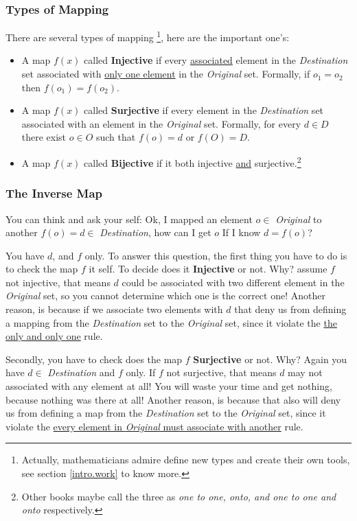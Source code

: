 \subsubsection{Types of Mapping}
There are several types of mapping \footnote{Actually, mathematicians admire define new types and create their own tools, see section \ref{intro.work} to know more.}, here are the important one's:
\begin{itemize}
    \item A map $f(x)$ called {\bf Injective} if every \underline{associated} element in the {\it Destination} set associated with \underline{only one element} in the {\it Original} set. Formally, if $o_1 = o_2$ then $f(o_1) = f(o_2)$.
    \item A map $f(x)$ called {\bf Surjective} if every element in the {\it Destination} set associated with an element in the {\it Original} set. Formally, for every $d \in D$ there exist $o \in O$ such that $f(o)=d$ or $f(O)=D$.
    \item A map $f(x)$ called {\bf Bijective} if it both injective \underline{and} surjective.\footnote{Other books maybe call the three as {\it  one to one, onto, and one to one and onto} respectively.}
\end{itemize}
\subsubsection{The Inverse Map} You can think and ask your self: Ok, I mapped an element $o \in$ {\it Original} to another $f(o) = d \in$ {\it Destination}, how can I get $o$ If I know $d = f(o)$? 

You have $d$, and $f$ only. To answer this question, the first thing you have to do is to check the map $f$ it self. To decide does it {\bf Injective} or not. Why? assume $f$ not injective, that means $d$ could be associated with two different element in the {\it Original} set, so you cannot determine which one is the correct one! Another reason, is because if we associate two elements with $d$ that deny us from defining a mapping from the {\it Destination } set to the {\it Original} set, since it violate the \underline{the only and only one} rule.

Secondly, you have to check does the map $f$ {\bf Surjective} or not. Why? Again you have $d \in$ {\it Destination} and $f$ only. If $f$ not surjective, that means $d$ may not associated with any element at all! You will waste your time and get nothing, because nothing was there at all! Another reason, is because that also will deny us from defining a map from the {\it Destination } set to the {\it Original} set, since it violate the \underline{every element in {\it Original} must associate with another} rule.

